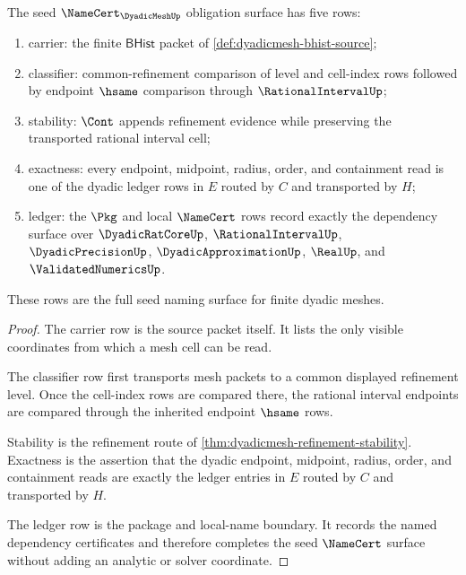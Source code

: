 \begin{theorem}
\label{thm:dyadicmesh-namecert-obligation-surface}
The seed $\NameCert_{\DyadicMeshUp}$ obligation surface has five rows:
\begin{enumerate}
\item carrier: the finite $\mathsf{BHist}$ packet of \autoref{def:dyadicmesh-bhist-source};
\item classifier: common-refinement comparison of level and cell-index rows followed by endpoint $\hsame$ comparison through $\RationalIntervalUp$;
\item stability: $\Cont$ appends refinement evidence while preserving the transported rational interval cell;
\item exactness: every endpoint, midpoint, radius, order, and containment read is one of the dyadic ledger rows in $E$ routed by $C$ and transported by $H$;
\item ledger: the $\Pkg$ and local $\NameCert$ rows record exactly the dependency surface over $\DyadicRatCoreUp$, $\RationalIntervalUp$, $\DyadicPrecisionUp$, $\DyadicApproximationUp$, $\RealUp$, and $\ValidatedNumericsUp$.
\end{enumerate}
These rows are the full seed naming surface for finite dyadic meshes.
\end{theorem}
\begin{proof}
The carrier row is the source packet itself. It lists the only visible coordinates from which a mesh cell can be read.

The classifier row first transports mesh packets to a common displayed refinement level. Once the cell-index rows are compared there, the rational interval endpoints are compared through the inherited endpoint $\hsame$ rows.

Stability is the refinement route of \autoref{thm:dyadicmesh-refinement-stability}. Exactness is the assertion that the dyadic endpoint, midpoint, radius, order, and containment reads are exactly the ledger entries in $E$ routed by $C$ and transported by $H$.

The ledger row is the package and local-name boundary. It records the named dependency certificates and therefore completes the seed $\NameCert$ surface without adding an analytic or solver coordinate.
\end{proof}


